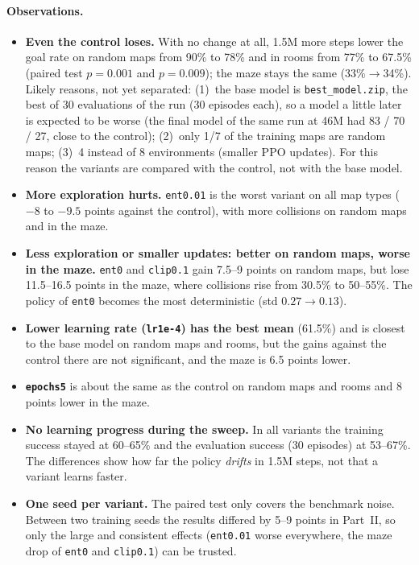 \documentclass[11pt,a4paper]{article}
\newcommand{\code}[1]{\texttt{#1}}
\begin{document}
\paragraph{Observations.}
\begin{itemize}[leftmargin=*]
      \item \textbf{Even the control loses.} With no change at all, 1.5M more steps
            lower the goal rate on random maps from 90\% to 78\% and in rooms from 77\%
            to 67.5\% (paired test $p=0.001$ and $p=0.009$); the maze stays the same
            (33\%$\to$34\%). Likely reasons, not yet separated:
            (1)~the base model is \code{best\_model.zip}, the best of 30
            evaluations of the run (30 episodes each), so a model a little later is expected to be worse
            (the final model of the same run at 46M had 83 / 70 / 27, close to the
            control); (2)~only 1/7 of the training maps are random maps;
            (3)~4 instead of 8 environments (smaller PPO updates).
            For this reason the variants are compared with the control, not with the
            base model.
      \item \textbf{More exploration hurts.} \code{ent0.01} is the worst variant on
            all map types ($-8$ to $-9.5$ points against the control), with more
            collisions on random maps and in the maze.
      \item \textbf{Less exploration or smaller updates: better on random maps,
            worse in the maze.} \code{ent0} and \code{clip0.1} gain 7.5--9 points on
            random maps, but lose 11.5--16.5 points in the maze, where collisions rise
            from 30.5\% to 50--55\%. The policy of \code{ent0} becomes the most
            deterministic (std $0.27\to0.13$).
      \item \textbf{Lower learning rate (\code{lr1e-4}) has the best mean} (61.5\%)
            and is closest to the base model on random maps and rooms, but the gains
            against the control there are not significant, and the maze is 6.5 points
            lower.
      \item \textbf{\code{epochs5}} is about the same as the control on random maps and
            rooms and 8 points lower in the maze.
      \item \textbf{No learning progress during the sweep.} In all variants the
            training success stayed at 60--65\% and the evaluation success (30
            episodes) at 53--67\%. The differences show how far the policy
            \emph{drifts} in 1.5M steps, not that a variant learns faster.
      \item \textbf{One seed per variant.} The paired test only covers the benchmark
            noise. Between two training seeds the results differed by 5--9 points in
            Part~II, so only the large and consistent effects (\code{ent0.01} worse
            everywhere, the maze drop of \code{ent0} and \code{clip0.1}) can be trusted.
\end{itemize}
\end{document}
